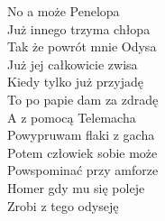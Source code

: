 No a może Penelopa \\
Już innego trzyma chłopa \\
Tak że powrót mnie Odysa \\
Już jej całkowicie zwisa \\
Kiedy tylko już przyjadę \\
To po papie dam za zdradę \\
A z pomocą Telemacha \\
Powypruwam flaki z gacha \\


Potem człowiek sobie może \\
Powspominać przy amforze \\
Homer gdy mu się poleje \\
Zrobi z tego odyseję \\



